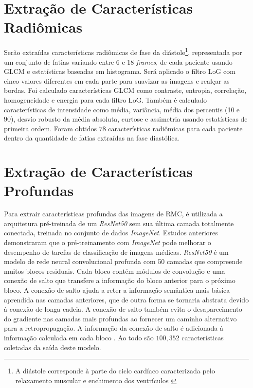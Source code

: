 \section{Extração de Características Radiômicas}
\label{subsec:cap4_caracteristicas_radiomicas}

Serão extraídas características radiômicas de fase da diástole\footnote{A diástole corresponde à parte do ciclo cardíaco caracterizada pelo relaxamento muscular e enchimento dos ventrículos \cite{brielerCardiomyopathyOverview2017}}, representada por um conjunto de fatias variando entre 6 e 18 \textit{frames}, de cada paciente usando \gls{GLCM} e estatísticas baseadas em histograma. Será aplicado o filtro \gls{LoG} com cinco valores diferentes em cada parte para suavizar as imagens e realçar as bordas. Foi calculado características \gls{GLCM} como contraste, entropia, correlação, homogeneidade e energia para cada filtro \gls{LoG}. Também é calculado características de intensidade como média, variância, média dos percentis (10 e 90), desvio robusto da média absoluta, curtose e assimetria usando estatísticas de primeira ordem. Foram obtidos 78 características radiômicas para cada paciente dentro da quantidade de fatias extraídas na fase diastólica.

\section{Extração de Características Profundas}
\label{subsec:cap4_caracteristicas_profundas}
 
Para extrair características profundas das imagens de \gls{RMC}, é utilizada a arquitetura pré-treinada de um \textit{ResNet50} sem sua última camada totalmente conectada, treinada no conjunto de dados \textit{ImageNet}. Estudos anteriores demonstraram que o pré-treinamento com \textit{ImageNet} pode melhorar o desempenho de tarefas de classificação de imagens médicas. \textit{ResNet50} é um modelo de rede neural convolucional profunda com 50 camadas que compreende muitos blocos residuais. Cada bloco contém módulos de convolução e uma conexão de salto que transfere a informação do bloco anterior para o próximo bloco. A conexão de salto ajuda a reter a informação semântica mais básica aprendida nas camadas anteriores, que de outra forma se tornaria abstrata devido à conexão de longa cadeia. A conexão de salto também evita o desaparecimento do gradiente nas camadas mais profundas ao fornecer um caminho alternativo para a retropropagação. A informação da conexão de salto é adicionada à informação calculada em cada bloco \cite{aiSelfAttentionBasedFusion2023}. Ao todo são $100,352$ características coletadas da saída deste modelo.

